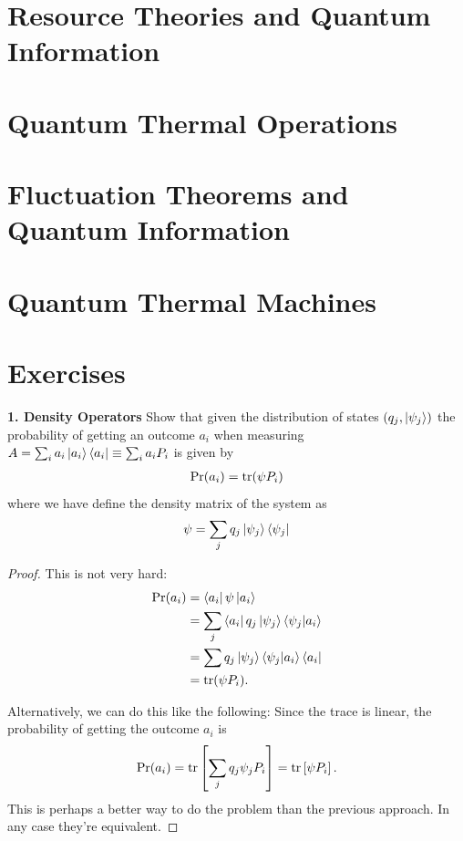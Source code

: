 \documentclass{book}
\theoremstyle{definition}
\newcommand{\nn}{\nonumber}
\newcommand{\lb}{\left[}
\newcommand{\rb}{\right]}
\begin{document}
\newpage

\section{Resource Theories and Quantum Information}


\newpage
\section{Quantum Thermal Operations}






\newpage
\section{Fluctuation Theorems and Quantum Information}


\newpage
\section{Quantum Thermal Machines}




\newpage


\section{Exercises}

\noindent \textbf{1. Density Operators} Show that given the distribution of states $(q_j, \ket{\psi_j})$ the probability of getting an outcome $a_i$ when measuring $A = \sum_i a_i \ket{a_i}\bra{a_i} \equiv \sum_i a_i P_i$ is given by
\begin{align}
\Pr(a_i) = \tr(\psi P_i)
\end{align} 
where we have define the density matrix of the system as
\begin{align}
\psi = \sum_j q_j \ket{\psi_j}\bra{\psi_j}
\end{align}


\begin{proof}
	This is not very hard: 
	\begin{align}
	\Pr(a_i) &= \bra{a_i} \psi \ket{a_i}\nn\\
	&= \sum_j \bra{a_i} q_j \ket{\psi_j}\bra{\psi_j}\ket{a_i}\nn\\
	&= \sum q_j \ket{\psi_j}\bra{\psi_j}\ket{a_i}\bra{a_i}\nn\\
	&= \tr(\psi P_i).
	\end{align}


Alternatively, we can do this like the following: Since the trace is linear, the probability of getting the outcome $a_i$ is 
\begin{align}
\Pr(a_i) = \tr\lb \sum_j q_j \psi_j P_i \rb = \tr\lb \psi P_i \rb.
\end{align}
This is perhaps a better way to do the problem than the previous approach. In any case they're equivalent. 
\end{proof}
\end{document}
